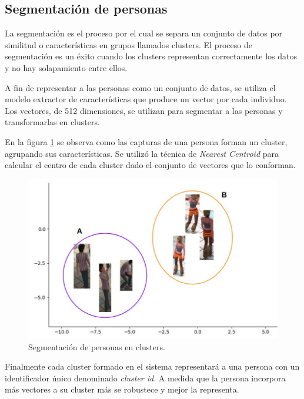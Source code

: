 \subsection{Segmentación de personas}
\label{sec:segmentacionPersonas}

La segmentación es el proceso por el cual se separa un conjunto de datos por similitud o características en grupos llamados clusters. El proceso de segmentación es un éxito cuando los clusters representan correctamente los datos y no hay solapamiento entre ellos.

A fin de representar a las personas como un conjunto de datos, se utiliza el modelo extractor de características que produce un vector por cada individuo. Los vectores, de 512 dimensiones, se utilizan para segmentar a las personas y transformarlas en clusters.

En la figura \ref{fig:clusterPersonas} se observa como las capturas de una persona forman un cluster, agrupando sus características. Se utilizó la técnica de \textit{Nearest Centroid} \citep{NEAREST_CENTROID} para calcular el centro de cada cluster dado el conjunto de vectores que lo conforman.

\begin{figure}[ht]
	\centering
	\includegraphics[scale=.6]{./Figures/clusterPersonas.jpg}
	\caption{Segmentación de personas en clusters.}
	\label{fig:clusterPersonas}
\end{figure}

Finalmente cada cluster formado en el sistema representará a una persona con un identificador único denominado \textit{cluster id}. A medida que la persona incorpora más vectores a su cluster más se robustece y mejor la representa.

\newpage

